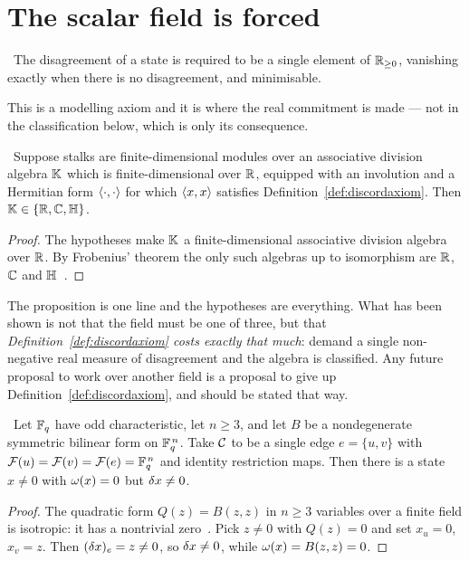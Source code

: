 \section{The scalar field is forced}

\begin{definition}\label{def:discordaxiom}
\Proposed\ The disagreement of a state is required to be a single element of
$\mathbb{R}_{\ge0}$, vanishing exactly when there is no disagreement, and minimisable.
\end{definition}

This is a modelling axiom and it is where the real commitment is made ---
not in the classification below, which is only its consequence.

\begin{proposition}
\label{prop:frobenius}
\Proved\ Suppose stalks are finite-dimensional modules over an associative
division algebra $\mathbb{K}$ which is finite-dimensional over $\mathbb{R}$, equipped
with an involution and a Hermitian form $\left\langle \cdot,\cdot\right\rangle$ for which
$\left\langle x,x\right\rangle$ satisfies Definition~\ref{def:discordaxiom}. Then
$\mathbb{K}\in\{\mathbb{R},\mathbb{C},\mathbb{H}\}$.
\end{proposition}
\begin{proof}
The hypotheses make $\mathbb{K}$ a finite-dimensional associative division
algebra over $\mathbb{R}$. By Frobenius' theorem the only such algebras up to
isomorphism are $\mathbb{R}$, $\mathbb{C}$ and $\mathbb{H}$~\cite{Palais}.
\end{proof}

\begin{hon}\Hon
The proposition is one line and the hypotheses are everything. What has been
shown is not that the field must be one of three, but that
\emph{Definition~\ref{def:discordaxiom} costs exactly that much}: demand a
single non-negative real measure of disagreement and the algebra is
classified. Any future proposal to work over another field is a proposal to
give up Definition~\ref{def:discordaxiom}, and should be stated that way.
\end{hon}

\begin{proposition}
\label{prop:finitefield}
\Proved\ Let $\mathbb{F}_{q}$ have odd characteristic, let $n\ge3$, and let $B$ be a
nondegenerate symmetric bilinear form on $\mathbb{F}_{q}^{\,n}$. Take $\mathcal{C}$ to be a
single edge $e=\{u,v\}$ with $\mathcal{F}(u)=\mathcal{F}(v)=\mathcal{F}(e)=\mathbb{F}_{q}^{\,n}$ and
identity restriction maps. Then there is a state $x\neq 0$ with
$\omega(x)=0$ but $\delta x\neq0$.
\end{proposition}
\begin{proof}
The quadratic form $Q(z)=B(z,z)$ in $n\ge3$ variables over a finite field is
isotropic: it has a nontrivial zero~\cite{Lam}. Pick $z\neq0$ with $Q(z)=0$
and set $x_u=0$, $x_v=z$. Then $(\delta x)_e=z\neq0$, so $\delta x\neq0$, while
$\omega(x)=B(z,z)=0$.
\end{proof}

